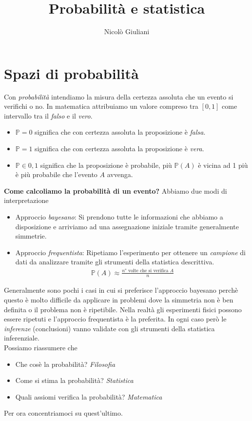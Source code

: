 \documentclass[a4paper,12pt]{article}
\title{Probabilità e statistica}
\author{Nicolò Giuliani}
\date{}
\begin{document}
\maketitle
\tableofcontents   %
\newpage
\section{Spazi di probabilità}
Con \textit{probabilità} intendiamo la misura della certezza assoluta che un evento si verifichi o no. In matematica attribuiamo un valore compreso tra $[0,1]$ come intervallo tra il \textit{falso} e il \textit{vero}. 
\begin{itemize}
  \item $\mathbb{P} = 0$ significa che con certezza assoluta la proposizione è \textit{falsa}.
  \item $\mathbb{P} = 1$ significa che con certezza assoluta la proposizione è \textit{vera}.
  \item $\mathbb{P} \in {0,1}$ significa che la proposizione è probabile, più $\mathbb{P}(A)$ è vicina ad 1 più è più probabile che l'evento $A$ avvenga.
\end{itemize}
\textbf{Come calcoliamo la probabilità di un evento?} Abbiamo due modi di interpretazione
\begin{itemize}
  \item Approccio \textit{bayesano}: Si prendono tutte le informazioni che abbiamo a disposizione e arriviamo ad una assegnazione iniziale tramite generalmente simmetrie.
  \item Approccio \textit{frequentista}: Ripetiamo l'esperimento per ottenere un \textit{campione} di dati da analizzare tramite gli strumenti della statistica descrittiva.
  \begin{align*}
      \mathbb{P}(A) \approx \frac{n° \text{ volte che si verifica } A}{n}
  \end{align*}
\end{itemize}
Generalmente sono pochi i casi in cui si preferisce l'approccio bayesano perchè questo è molto difficile da applicare in problemi dove la simmetria non è ben definita o il problema non è ripetibile. Nella realtà gli esperimenti fisici possono essere ripetuti e l'approccio frequentista è la preferita. In ogni caso però le \textit{inferenze} (conclusioni) vanno validate con gli strumenti della statistica inferenziale.
\vspace{1em}\\
Possiamo riassumere che
\begin{itemize}
  \item Che cosè la probabilità? \textit{Filosofia}
  \item Come si stima la probabilità? \textit{Statistica}
  \item Quali assiomi verifica la probabilità? \textit{Matematica}
\end{itemize}
Per ora concentriamoci su quest'ultimo.
\end{document}
